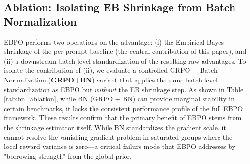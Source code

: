 \documentclass{article}
\theoremstyle{plain}
\theoremstyle{definition}
\theoremstyle{remark}
\begin{document}
\subsection{Ablation: Isolating EB Shrinkage from Batch Normalization}
\label{appendix:ablation}

EBPO performs two operations on the advantage: (i) the Empirical Bayes shrinkage of the per-prompt baseline (the central contribution of this paper), and (ii) a downstream batch-level standardization of the resulting raw advantages. To isolate the contribution of (ii), we evaluate a controlled GRPO + Batch Normalization (\textbf{GRPO+BN}) variant that applies the same batch-level standardization as EBPO but \emph{without} the EB shrinkage step. As shown in Table \ref{tab:bn_ablation}, while BN (GRPO + BN) can provide marginal stability in certain benchmarks, it lacks the consistent performance profile of the full EBPO framework. These results confirm that the primary benefit of EBPO stems from the shrinkage estimator itself. While BN standardizes the gradient scale, it cannot resolve the vanishing gradient problem in saturated groups where the local reward variance is zero—a critical failure mode that EBPO addresses by "borrowing strength" from the global prior.
\end{document}
